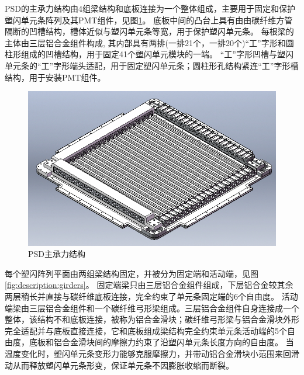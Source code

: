 PSD的主承力结构由4组梁结构和底板连接为一个整体组成，主要用于固定和保护塑闪单元条阵列及其PMT组件，见图\ref{fig:description:bottom_plate}。
底板中间的凸台上具有由由碳纤维方管隔断的凹槽结构，槽体近似与塑闪单元条等宽，用于保护塑闪单元条。
每根梁的主体由三层铝合金组件构成, 其内部具有两排(一排21个，一排20个)“工”字形和圆柱形组成的凹槽结构，用于固定41个塑闪单元模块的一端。
“工”字形凹槽与塑闪单元条的“工”字形端头适配，用于固定塑闪单元条；圆柱形孔结构紧连“工”字形槽结构，用于安装PMT组件。

\begin{figure}[h!]
\centering
\includegraphics[width=0.7\linewidth]{chap/description/fig/bottom_plate}
\caption{PSD主承力结构}
\label{fig:description:bottom_plate}
\end{figure}

每个塑闪阵列平面由两组梁结构固定，并被分为固定端和活动端，见图\ref{fig:description:girders}。
固定端梁只由三层铝合金组件组成，下层铝合金较其余两层稍长并直接与碳纤维底板连接，完全约束了单元条固定端的6个自由度。
活动端梁由三层铝合金组件和一个碳纤维弓形梁组成。三层铝合金组件自身连接成一个整体，该结构不和底板连接，被称为铝合金滑块；碳纤维弓形梁与铝合金滑块外形完全适配并与底板直接连接，它和底板组成梁结构完全约束单元条活动端的5个自由度，底板和铝合金滑块间的摩擦力约束了沿塑闪单元条长度方向的自由度。
当温度变化时，塑闪单元条变形力能够克服摩擦力，并带动铝合金滑块小范围来回滑动从而释放塑闪单元条形变，保证单元条不因膨胀收缩而断裂。

